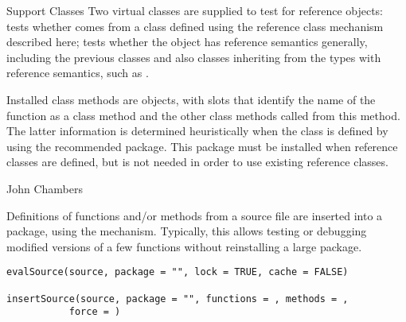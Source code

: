 %
\begin{Section}{Support Classes}
Two virtual classes are supplied to test for reference objects:
 tests whether  comes from a class
defined using the reference class mechanism described here;
 tests whether the object has reference
semantics generally, including the previous classes and also classes
inheriting from the \R{} types with reference semantics, such as
.

Installed class methods are  objects,
with slots that identify the name of the function as a class method
and the other class methods called from this method.
The latter information is determined heuristically when the class is
defined by using the  recommended package.  This
package must be installed when reference classes are defined, but is
not needed in order to use existing reference classes.
\end{Section}
%
\begin{Author}\relax
John Chambers
\end{Author}
%
\begin{Description}\relax
Definitions of functions and/or methods from a source file are
inserted into a package, using the  mechanism.
Typically, this allows testing or debugging modified versions of a few
functions without reinstalling a large package.
\end{Description}
%
\begin{Usage}
\begin{verbatim}
evalSource(source, package = "", lock = TRUE, cache = FALSE)

insertSource(source, package = "", functions = , methods = ,
           force = )

\end{verbatim}
\end{Usage}
%
